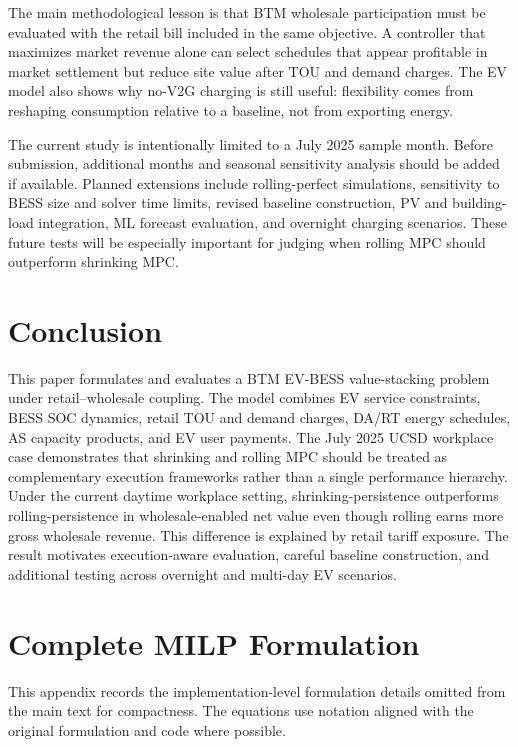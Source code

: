 \documentclass[final,5p,times]{elsarticle}
\begin{document}
The main methodological lesson is that BTM wholesale participation must be evaluated with the retail bill included in the same objective. A controller that maximizes market revenue alone can select schedules that appear profitable in market settlement but reduce site value after TOU and demand charges. The EV model also shows why no-V2G charging is still useful: flexibility comes from reshaping consumption relative to a baseline, not from exporting energy.

The current study is intentionally limited to a July 2025 sample month. Before submission, additional months and seasonal sensitivity analysis should be added if available. Planned extensions include rolling-perfect simulations, sensitivity to BESS size and solver time limits, revised baseline construction, PV and building-load integration, ML forecast evaluation, and overnight charging scenarios. These future tests will be especially important for judging when rolling MPC should outperform shrinking MPC.

\section{Conclusion}
\label{sec:conclusion}

This paper formulates and evaluates a BTM EV-BESS value-stacking problem under retail--wholesale coupling. The model combines EV service constraints, BESS SOC dynamics, retail TOU and demand charges, DA/RT energy schedules, AS capacity products, and EV user payments. The July 2025 UCSD workplace case demonstrates that shrinking and rolling MPC should be treated as complementary execution frameworks rather than a single performance hierarchy. Under the current daytime workplace setting, shrinking-persistence outperforms rolling-persistence in wholesale-enabled net value even though rolling earns more gross wholesale revenue. This difference is explained by retail tariff exposure. The result motivates execution-aware evaluation, careful baseline construction, and additional testing across overnight and multi-day EV scenarios.

\appendix
\section{Complete MILP Formulation}
\label{app:complete_milp}

This appendix records the implementation-level formulation details omitted from the main text for compactness. The equations use notation aligned with the original formulation and code where possible.
\end{document}
